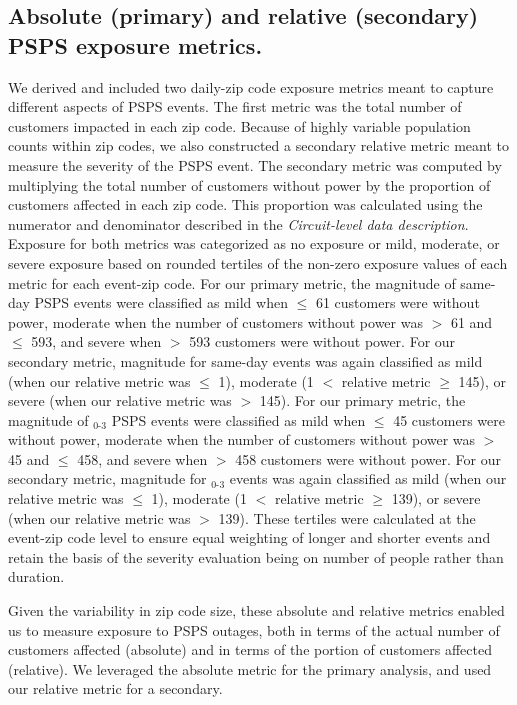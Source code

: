 \documentclass[../main.tex]{subfiles}
\begin{document}
\subsection{Absolute (primary) and relative (secondary) PSPS exposure metrics.}
We derived and included two daily-zip code exposure metrics meant to capture different aspects of PSPS events. The first metric was the total number of customers impacted in each zip code. Because of highly variable population counts within zip codes, we also constructed a secondary relative metric meant to measure the severity of the PSPS event. The secondary metric was computed by multiplying the total number of customers without power by the proportion of customers affected in each zip code. This proportion was calculated using the numerator and denominator described in the \textit{Circuit-level data description}. Exposure for both metrics was categorized as no exposure or mild, moderate, or severe exposure based on rounded tertiles of the non-zero exposure values of each metric for each event-zip code. For our primary metric, the magnitude of same-day PSPS events were classified as mild when $\leq$ 61 customers were without power, moderate when the number of customers without power was $>$ 61 and $\leq$ 593, and severe when $>$ 593 customers were without power. For our secondary metric, magnitude for same-day events was again classified as mild (when our relative metric was $\leq$ 1), moderate (1 $<$ relative metric $\geq$ 145), or severe (when our relative metric was $>$ 145). For our primary metric, the magnitude of $_{0\text{-}3}$ PSPS events were classified as mild when $\leq$ 45 customers were without power, moderate when the number of customers without power was $>$ 45 and $\leq$ 458, and severe when $>$ 458 customers were without power. For our secondary metric, magnitude for $_{0\text{-}3}$ events was again classified as mild (when our relative metric was $\leq$ 1), moderate (1 $<$ relative metric $\geq$ 139), or severe (when our relative metric was $>$ 139). These tertiles were calculated at the event-zip code level to ensure equal weighting of longer and shorter events and retain the basis of the severity evaluation being on number of people rather than duration.  

Given the variability in zip code size, these absolute and relative metrics enabled us to measure exposure to PSPS outages, both in terms of the actual number of customers affected (absolute) and in terms of the portion of customers affected (relative). We leveraged the absolute metric for the primary analysis, and used our relative metric for a secondary.
\end{document}
